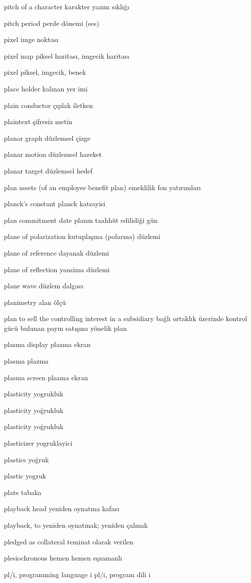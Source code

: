 \documentclass[12pt,fleqn]{article}\usepackage{../../common}
\begin{document}
pitch of a character karakter yazım sıklığı

pitch period perde dönemi (ses)

pixel imge noktası

pixel map piksel haritası, imgecik haritası

pixel piksel, imgecik, benek

place holder kalınan yer imi

plain conductor çıplak iletken

plaintext şifresiz metin

planar graph düzlemsel çizge

planar motion düzlemsel hareket

planar target düzlemsel hedef

plan assets (of an employee benefit plan) emeklilik fon yatırımları

planck's constant planck katsayisi

plan commitment date planın taahhüt edilidiği gün

plane of polarization kutuplaşma (polarma) düzlemi

plane of reference dayanak düzlemi

plane of reflection yansima düzlemi

plane wave düzlem dalgası

planimetry alan ölçü

plan to sell the controlling interest in a subsidiary bağlı ortaklık üzerinde kontrol gücü bulunan payın satışına yönelik plan

plasma display plazma ekran

plasma plazma

plasma screen plazma ekran

plasticity yogrukluk

plasticity yoğrukluk

plasticity yoğrukluk

plasticizer yogruklayici

plastics yoğruk

plastic yogruk

plate tabaka

playback head yeniden oynatma kafası

playback, to yeniden oynatmak; yeniden çalmak

pledged as collateral teminat olarak verilen

plesiochronous hemen hemen eşzamanlı

pl/i, programming language i pl/i, program dili i
\end{document}
